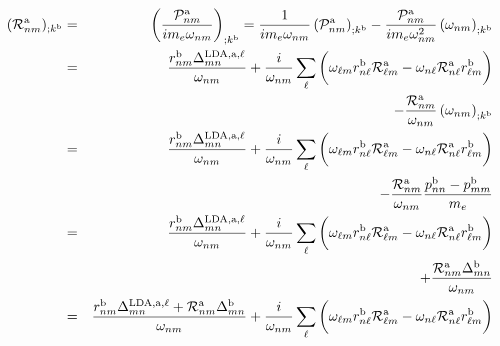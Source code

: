 \begin{eqnarray}\label{a_rgendevnnn}
({\cal R}^{\mathrm{a}}_{nm})_{;k^{\mathrm{b}}}&=&\left(\frac{{\cal P}^{\mathrm{a}}_{nm}}{im_e\omega_{nm}}\right)_{;k^{\mathrm{b}}}
=
\frac{1}
{im_e\omega_{nm}}
\left(
{\cal P}^{\mathrm{a}}_{nm}
\right)_{;k^{\mathrm{b}}}
-
\frac{{\cal P}^{\mathrm{a}}_{nm}}
{im_e\omega^2_{nm}}
\left(
\omega_{nm}
\right)_{;k^{\mathrm{b}}}
\nonumber \\
&=&
\frac{r^{\mathrm{b}}_{nm}
\Delta^{\mathrm{LDA},\mathrm{a},\ell}_{mn}}
{\omega_{nm}}
+
\frac{i}{\omega_{nm}}
\sum_{\ell}
\bigg(
\omega_{\ell m}
r^{\mathrm{b}}_{n\ell}
{\cal R}^{\mathrm{a}}_{\ell m}
-
\omega_{n\ell}
{\cal R}^{\mathrm{a}}_{n\ell}
r^{\mathrm{b}}_{\ell m}
\bigg)
\nonumber \\
&&
-
\frac{{\cal R}^{\mathrm{a}}_{nm}}
{\omega_{nm}}
\left(
\omega_{nm}
\right)_{;k^{\mathrm{b}}}
\nonumber \\
&=&
\frac{r^{\mathrm{b}}_{nm}
\Delta^{\mathrm{LDA},\mathrm{a},\ell}_{mn}}
{\omega_{nm}}
+
\frac{i}{\omega_{nm}}
\sum_{\ell}
\bigg(
\omega_{\ell m}
r^{\mathrm{b}}_{n\ell}
{\cal R}^{\mathrm{a}}_{\ell m}
-
\omega_{n\ell}
{\cal R}^{\mathrm{a}}_{n\ell}
r^{\mathrm{b}}_{\ell m}
\bigg)
\nonumber \\
&&
-
\frac{{\cal R}^{\mathrm{a}}_{nm}}
{\omega_{nm}}
\frac{p^{\mathrm{b}}_{nn}-p^{\mathrm{b}}_{mm}}{m_e}
\nonumber \\
&=&
\frac{r^{\mathrm{b}}_{nm}
\Delta^{\mathrm{LDA},\mathrm{a},\ell}_{mn}}
{\omega_{nm}}
+
\frac{i}{\omega_{nm}}
\sum_{\ell}
\bigg(
\omega_{\ell m}
r^{\mathrm{b}}_{n\ell}
{\cal R}^{\mathrm{a}}_{\ell m}
-
\omega_{n\ell}
{\cal R}^{\mathrm{a}}_{n\ell}
r^{\mathrm{b}}_{\ell m}
\bigg)
\nonumber \\
&&
+
\frac{
{\cal R}^{\mathrm{a}}_{nm}\Delta^{\mathrm{b}}_{mn}
}
{\omega_{nm}}
\nonumber \\
&=&
\frac{r^{\mathrm{b}}_{nm}
\Delta^{\mathrm{LDA},\mathrm{a},\ell}_{mn}
+
{\cal R}^{\mathrm{a}}_{nm}\Delta^{\mathrm{b}}_{mn}
}
{\omega_{nm}}
+
\frac{i}{\omega_{nm}}
\sum_{\ell}
\bigg(
\omega_{\ell m}
r^{\mathrm{b}}_{n\ell}
{\cal R}^{\mathrm{a}}_{\ell m}
-
\omega_{n\ell}
{\cal R}^{\mathrm{a}}_{n\ell}
r^{\mathrm{b}}_{\ell m}
\bigg)
\end{eqnarray}
